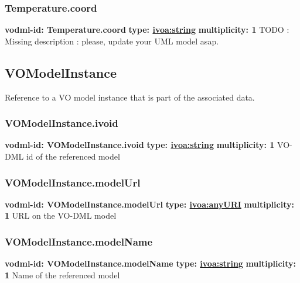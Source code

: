     \subsubsection{Temperature.coord}
      \textbf{vodml-id: Temperature.coord} \newline
      \textbf{type: \hyperref[sect:ivoa]{ivoa:string}} \newline
      \textbf{multiplicity: 1} \newline 
      TODO : Missing description : please, update your UML model asap.

  \subsection{VOModelInstance}
  \label{sect:VOModelInstance}
    Reference to a VO model instance that is part of the associated data.

    \subsubsection{VOModelInstance.ivoid}
      \textbf{vodml-id: VOModelInstance.ivoid} \newline
      \textbf{type: \hyperref[sect:ivoa]{ivoa:string}} \newline
      \textbf{multiplicity: 1} \newline 
      VO-DML id of the referenced model

    \subsubsection{VOModelInstance.modelUrl}
      \textbf{vodml-id: VOModelInstance.modelUrl} \newline
      \textbf{type: \hyperref[sect:ivoa]{ivoa:anyURI}} \newline
      \textbf{multiplicity: 1} \newline 
      URL on the VO-DML model

    \subsubsection{VOModelInstance.modelName}
      \textbf{vodml-id: VOModelInstance.modelName} \newline
      \textbf{type: \hyperref[sect:ivoa]{ivoa:string}} \newline
      \textbf{multiplicity: 1} \newline 
      Name of the referenced model

